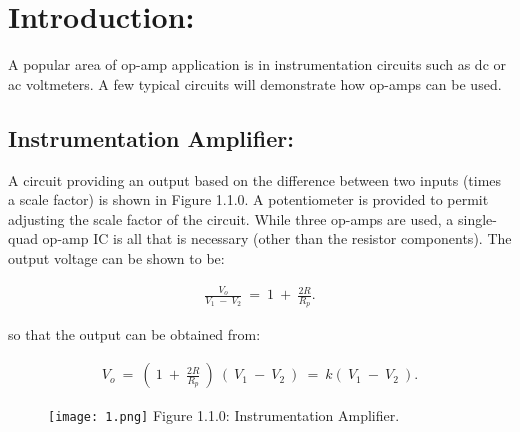 \section{Introduction:}

A popular area of op-amp application is in instrumentation circuits such as dc or ac voltmeters. A few typical circuits will demonstrate how op-amps can be used.

\subsection{Instrumentation Amplifier:}

A circuit providing an output based on the difference between two inputs (times a scale factor) is shown in Figure 1.1.0. A potentiometer is provided to permit adjusting the scale factor of the circuit. While three op-amps are used, a single-quad op-amp IC is all that is necessary (other than the resistor components). The output voltage can be shown to be: \hfill \break
 
\begin{ceqn}
\begin{align*}
\frac{V_{o}}{V_{1}\ -\ V_{2}}\ =\ 1\ +\ \frac{2R}{R_{p}}.
\end{align*}
\end{ceqn} \hfill \break

so that the output can be obtained from: \hfill \break
 
\begin{ceqn}
\begin{align*}
V_{o}\ =\ (\ 1\ +\ \frac{2R}{R_{p}}\ )\ (\ V_{1}\ -\ V_{2}\ )\ =\ k(\ V_{1}\ -\ V_{2}\ ).
\end{align*}
\end{ceqn} \hfill \break

\begin{figure}[H]
\texttt{[image: 1.png]}
\linebreak \linebreak \centering Figure 1.1.0: Instrumentation Amplifier.
\end{figure}

\pagebreak
